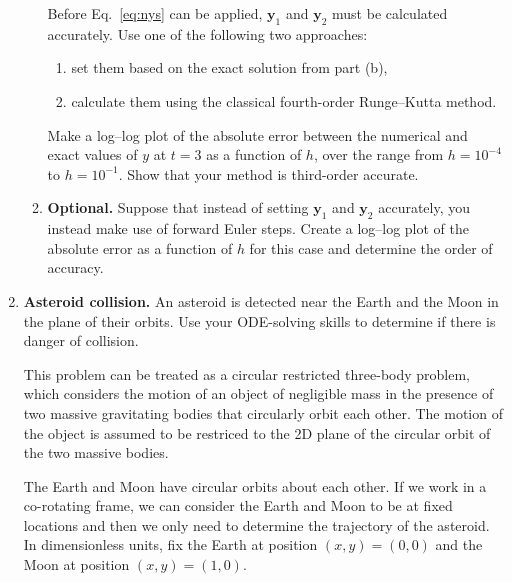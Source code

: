 \documentclass[11pt]{article}
\renewcommand{\vec}[1]{\mathbf{#1}}
\begin{document}
\begin{enumerate}
\begin{enumerate}
	Before Eq.~\ref{eq:nys} can be applied, $\vec{y}_1$ and $\vec{y}_2$
	must be calculated accurately. Use one of the following two approaches:
	\begin{enumerate}
	  \item set them based on the exact solution from part (b),
	  \item calculate them using the classical fourth-order Runge--Kutta
	    method.
	\end{enumerate}
	Make a log--log plot of the absolute error between the numerical and
	exact values of $y$ at $t=3$ as a function of $h$, over the range from
	$h=10^{-4}$ to $h=10^{-1}$. Show that your method is third-order
	accurate.
      \item \textbf{Optional.} Suppose that instead of setting $\vec{y}_1$ and
	$\vec{y}_2$ accurately, you instead make use of forward Euler steps.
	Create a log--log plot of the absolute error as a function of $h$ for
	this case and determine the order of accuracy.
    \end{enumerate}
  \item \textbf{Asteroid collision.} An asteroid is detected near the Earth and
    the Moon in the plane of their orbits. Use your ODE-solving skills to
    determine if there is danger of collision.

    This problem can be treated as a circular restricted three-body problem,
    which considers the motion of an object of negligible mass in the presence
    of two massive gravitating bodies that circularly orbit each other. The
    motion of the object is assumed to be restriced to the 2D plane of the
    circular orbit of the two massive bodies.

    The Earth and Moon have circular orbits about each other. If we work in a
    co-rotating frame, we can consider the Earth and Moon to be at fixed
    locations and then we only need to determine the trajectory of the
    asteroid. In dimensionless units, fix the Earth at position $(x,y)=(0,0)$
    and the Moon at position $(x,y)=(1,0)$. 


\end{enumerate}
\end{document}
